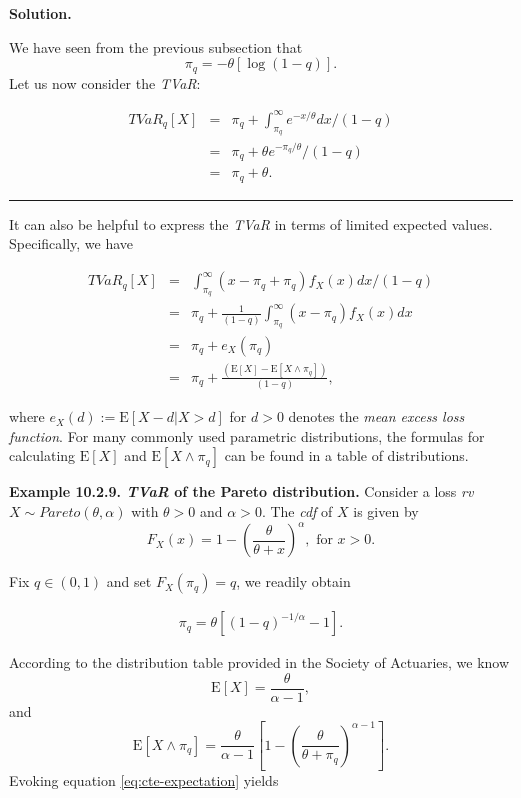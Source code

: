\documentclass[]{book}
\theoremstyle{definition}
\theoremstyle{definition}
\theoremstyle{definition}
\theoremstyle{remark}
\begin{document}
\hypertarget{toggleExamplePortMgt.2.8}{}
\textbf{Solution.}

We have seen from the previous subsection that \[
\pi_q=-\theta[\log(1-q)].
\] Let us now consider the \emph{TVaR}:

\begin{eqnarray*}
  TVaR_q[X] &=& \pi_q+\int_{\pi_q}^{\infty} e^{-x/\theta}dx/(1-q)\\
&=& \pi_q+\theta e^{-\pi_q/\theta}/(1-q)\\
&=& \pi_q+\theta.
\end{eqnarray*}

\begin{center}\rule{0.5\linewidth}{\linethickness}\end{center}

It can also be helpful to express the \emph{TVaR} in terms of limited
expected values. Specifically, we have

\begin{eqnarray}
  TVaR_q[X] &=& \int_{\pi_q}^{\infty} (x-\pi_q+\pi_q)f_X(x)dx/(1-q) \nonumber\\
&=& \pi_q+\frac{1}{(1-q)}\int_{\pi_q}^{\infty} (x-\pi_q)f_X(x)dx\nonumber\\
&=& \pi_q+e_X(\pi_q)\nonumber\\
&=& \pi_q +\frac{\left({\mathrm{E}[X]-\mathrm{E}[X\wedge\pi_q]}\right)}{(1-q)},
\label{eq:cte-expectation}
\end{eqnarray}

where \(e_X(d):=\mathrm{E}[X-d|X>d]\) for \(d>0\) denotes the \emph{mean
excess loss function}. For many commonly used parametric distributions,
the formulas for calculating \(\mathrm{E}[X]\) and
\(\mathrm{E}[X\wedge\pi_q]\) can be found in a table of distributions.

\textbf{Example 10.2.9. \emph{TVaR} of the Pareto distribution.}
Consider a loss \emph{rv}~\(X\sim Pareto(\theta,\alpha)\) with
\(\theta>0\) and \(\alpha>0\). The \emph{cdf} of \(X\) is given by \[
F_X(x)=1-\left(\frac{\theta}{\theta+x} \right)^{\alpha}, \text{ for } x>0 .
\]

Fix \(q\in (0,1)\) and set \(F_X(\pi_q)=q\), we readily obtain

\begin{eqnarray}
\pi_q=\theta\left[(1-q)^{-1/\alpha}-1 \right].
\label{eq:var-pareto}
\end{eqnarray}

According to the distribution table provided in the Society of
Actuaries, we know \[
\mathrm{E}[X]=\frac{\theta}{\alpha-1},
\] and \[
\mathrm{E}[X\wedge \pi_q]=\frac{\theta}{\alpha-1}\left[
1-\left(\frac{\theta}{\theta+\pi_q}\right)^{\alpha-1}
\right].
\] Evoking equation \eqref{eq:cte-expectation} yields
\end{document}
